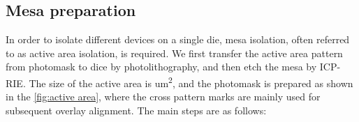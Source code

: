 \subsection{Mesa preparation}

In  order  to isolate different devices on a single die, mesa  isolation, often referred to as active area  isolation, is required. We first transfer the active area pattern from photomask  to  dice by  photolithography, and then etch the mesa by ICP-RIE. The size of the active area  is  \unit{um^2}, and the photomask is prepared as shown in the \autoref{fig:active area}, where the cross pattern marks are mainly used for subsequent overlay alignment. The main steps are as follows:

